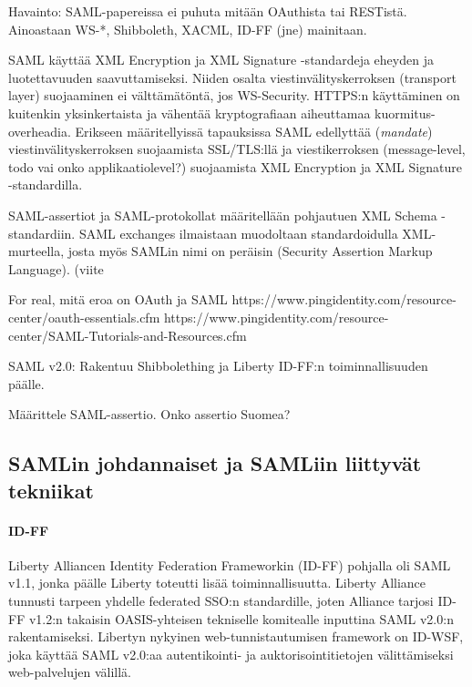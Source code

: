 \documentclass[finnish,gradu]{tktltiki}
\begin{document}
  Havainto: SAML-papereissa ei puhuta mitään OAuthista tai RESTistä. Ainoastaan WS-*, Shibboleth, XACML, ID-FF (jne) mainitaan.

  SAML käyttää XML Encryption ja XML Signature -standardeja eheyden ja luotettavuuden saavuttamiseksi.
  Niiden osalta viestinvälityskerroksen (transport layer) suojaaminen ei välttämätöntä, jos WS-Security.
  HTTPS:n käyttäminen on kuitenkin yksinkertaista ja vähentää kryptografiaan aiheuttamaa kuormitus-overheadia.
  Erikseen määritellyissä tapauksissa SAML edellyttää (\emph{mandate}) viestinvälityskerroksen suojaamista SSL/TLS:llä ja viestikerroksen (message-level, todo vai onko applikaatiolevel?) suojaamista XML Encryption ja XML Signature -standardilla.

  SAML-assertiot ja SAML-protokollat määritellään pohjautuen XML Schema -standardiin.
  SAML exchanges ilmaistaan muodoltaan standardoidulla XML-murteella, josta myös SAMLin nimi on peräisin (Security Assertion Markup Language). (viite


  For real, mitä eroa on OAuth ja SAML
  https://www.pingidentity.com/resource-center/oauth-essentials.cfm
  https://www.pingidentity.com/resource-center/SAML-Tutorials-and-Resources.cfm


  SAML v2.0: Rakentuu Shibbolething ja Liberty ID-FF:n toiminnallisuuden päälle.

  Määrittele SAML-assertio. Onko assertio Suomea?


  \subsection{SAMLin johdannaiset ja SAMLiin liittyvät tekniikat} %
  \label{sub:samlin_johdannaiset}


  \paragraph{ID-FF} %
  \label{par:id_ff}
  Liberty Alliancen Identity Federation Frameworkin (ID-FF) pohjalla oli SAML v1.1, jonka päälle Liberty toteutti lisää toiminnallisuutta.
  Liberty Alliance tunnusti tarpeen yhdelle federated SSO:n standardille, joten Alliance tarjosi ID-FF v1.2:n takaisin OASIS-yhteisen tekniselle komitealle inputtina SAML v2.0:n rakentamiseksi.
  Libertyn nykyinen web-tunnistautumisen framework on ID-WSF, joka käyttää SAML v2.0:aa autentikointi- ja auktorisointitietojen välittämiseksi web-palvelujen välillä.
\end{document}
